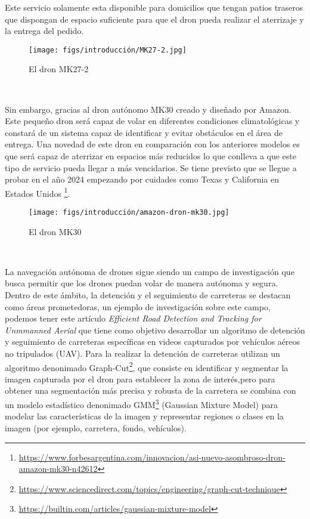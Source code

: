 Este servicio solamente esta disponible para domicilios que tengan patios traseros que dispongan de espacio suficiente para que el dron pueda realizar el aterrizaje y la 
entrega del pedido.

\begin{figure} [H]
  \begin{center}
    \texttt{[image: figs/introducción/MK27-2.jpg]}
  \end{center}
  \caption{El dron MK27-2}
  \label{fig:MK27-2}
\end{figure}\

Sin embargo, gracias al dron autónomo MK30 creado y diseñado por Amazon. Este pequeño dron será capaz de volar en diferentes condiciones climatológicas y 
constará de un sistema capaz de identificar y evitar obstáculos en el área de entrega. Una novedad de este dron en comparación con los anteriores modelos es que será capaz de aterrizar en espacios más reducidos lo que conlleva a que
este tipo de servicio pueda llegar a más vencidarios. \newline
Se tiene previsto que se llegue a probar en el año 2024 empezando por cuidades como Texas y California en Estados Unidos
\footnote{\url{https://www.forbesargentina.com/innovacion/asi-nuevo-asombroso-dron-amazon-mk30-n42612}}. \newline


\begin{figure} [H]
  \begin{center}
    \texttt{[image: figs/introducción/amazon-dron-mk30.jpg]}
  \end{center}
  \caption{El dron MK30}
  \label{fig:MK30}
\end{figure}\

La navegación autónoma de drones sigue siendo un campo de investigación que busca permitir que los drones puedan volar de manera autónoma y segura.
Dentro de este ámbito, la detención y el seguimiento de carreteras se destacan como áreas prometedoras, un ejemplo de investigación sobre este campo, podemos 
tener este artículo \textit{Efficient Road Detection and Tracking for Unmmanned Aerial} \cite{article} que tiene como objetivo desarrollar un algoritmo de detención 
y seguimiento de carreteras específicas en videos capturados por vehículos aéreos no tripulados (UAV). Para la realizar la detención de carreteras utilizan 
un algoritmo denonimado Graph-Cut\footnote{\url{https://www.sciencedirect.com/topics/engineering/graph-cut-technique}}, 
que consiste en identificar y segmentar la imagen capturada por el dron para establecer la zona de interés,pero para obtener una segmentación más precisa y robusta de la carretera 
se combina con un modelo estadístico denonimado GMM\footnote{\url{https://builtin.com/articles/gaussian-mixture-model}} (Gaussian Mixture Model) para modelar las características de la imagen y representar regiones o clases
en la imagen (por ejemplo, carretera, fondo, vehículos).\newline

